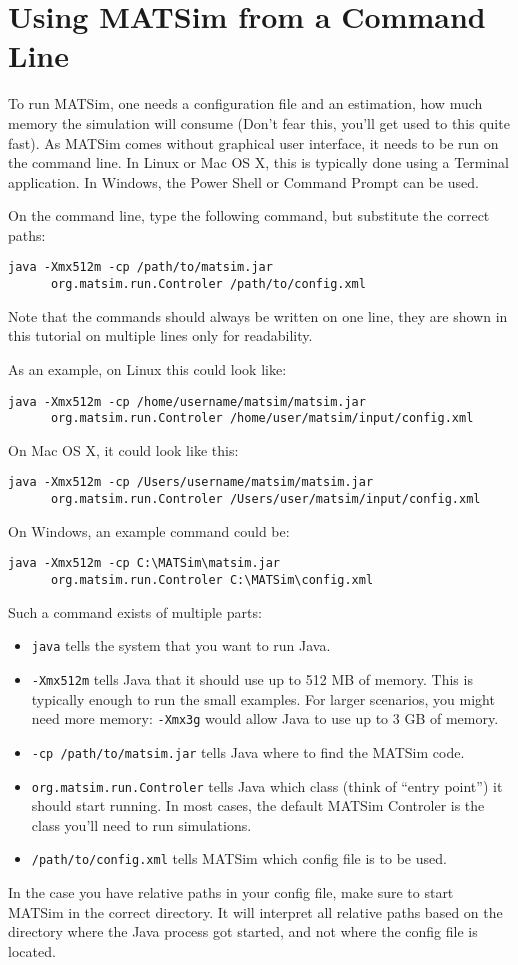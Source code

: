 \section{Using MATSim from a Command Line}
To run MATSim, one needs a configuration file and an estimation, how much memory
the simulation will consume (Don't fear this, you'll get used to this quite
fast). As MATSim comes without graphical user interface, it needs to be run on
the command line. In Linux or Mac OS X, this is typically done using a Terminal
application. In Windows, the Power Shell or Command Prompt can be used.

On the command line, type the following command, but substitute the correct
paths:
\begin{verbatim}
java -Xmx512m -cp /path/to/matsim.jar
      org.matsim.run.Controler /path/to/config.xml
\end{verbatim}
Note that the commands should always be written on one line, they are shown in
this tutorial on multiple lines only for readability.

As an example, on Linux this could look like:
\begin{verbatim}
java -Xmx512m -cp /home/username/matsim/matsim.jar 
      org.matsim.run.Controler /home/user/matsim/input/config.xml
\end{verbatim}

On Mac OS X, it could look like this:
\begin{verbatim}
java -Xmx512m -cp /Users/username/matsim/matsim.jar 
      org.matsim.run.Controler /Users/user/matsim/input/config.xml
\end{verbatim}

On Windows, an example command could be:
\begin{verbatim}
java -Xmx512m -cp C:\MATSim\matsim.jar 
      org.matsim.run.Controler C:\MATSim\config.xml
\end{verbatim}

Such a command exists of multiple parts:
\begin{itemize}
  \item {\tt java} tells the system that you want to run Java.
  \item {\tt -Xmx512m} tells Java that it should use up to 512 MB of memory.
  This is typically enough to run the small examples. For larger scenarios, you
  might need more memory: {\tt -Xmx3g} would allow Java to use up to 3 GB of
  memory.
  \item {\tt -cp /path/to/matsim.jar} tells Java where to find the MATSim code.
  \item {\tt org.matsim.run.Controler} tells Java which class (think of ``entry
  point'') it should start running. In most cases, the default MATSim Controler
  is the class you'll need to run simulations.
  \item {\tt /path/to/config.xml} tells MATSim which config file is to be used.
\end{itemize}

In the case you have relative paths in your config file, make sure to start
MATSim in the correct directory. It will interpret all relative paths based on
the directory where the Java process got started, and not where the config file
is located.

